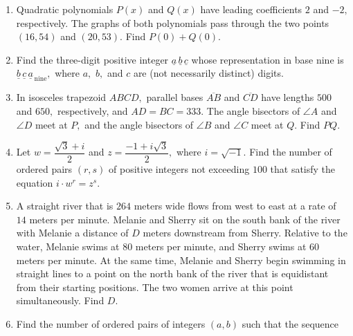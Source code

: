\documentclass{article}
\begin{document}
\begin{enumerate}[label=\arabic*., itemsep=0.5em]\item Quadratic polynomials \(P(x)\) and \(Q(x)\) have leading coefficients \(2\) and \(-2,\) respectively. The graphs of both polynomials pass through the two points \((16,54)\) and \((20,53).\) Find \(P(0) + Q(0).\)\par \vspace{0.5em}\item Find the three-digit positive integer \(\underline{a}\,\underline{b}\,\underline{c}\) whose representation in base nine is \(\underline{b}\,\underline{c}\,\underline{a}_{\,\text{nine}},\) where \(a,\) \(b,\) and \(c\) are (not necessarily distinct) digits.\par \vspace{0.5em}\item In isosceles trapezoid \(ABCD,\) parallel bases \(\overline{AB}\) and \(\overline{CD}\) have lengths \(500\) and \(650,\) respectively, and \(AD=BC=333.\) The angle bisectors of \(\angle A\) and \(\angle D\) meet at \(P,\) and the angle bisectors of \(\angle B\) and \(\angle C\) meet at \(Q.\) Find \(PQ.\)\par \vspace{0.5em}\item Let \(w = \dfrac{\sqrt{3} + i}{2}\) and \(z = \dfrac{-1 + i\sqrt{3}}{2},\) where \(i = \sqrt{-1}.\) Find the number of ordered pairs \((r,s)\) of positive integers not exceeding \(100\) that satisfy the equation \(i \cdot w^r = z^s.\)\par \vspace{0.5em}\item A straight river that is \(264\) meters wide flows from west to east at a rate of \(14\) meters per minute. Melanie and Sherry sit on the south bank of the river with Melanie a distance of \(D\) meters downstream from Sherry. Relative to the water, Melanie swims at \(80\) meters per minute, and Sherry swims at \(60\) meters per minute. At the same time, Melanie and Sherry begin swimming in straight lines to a point on the north bank of the river that is equidistant from their starting positions. The two women arrive at this point simultaneously. Find \(D.\)\par \vspace{0.5em}\item Find the number of ordered pairs of integers \((a,b)\) such that the sequence 
\begin{equation*}

\end{equation*}
\end{enumerate}
\end{document}
